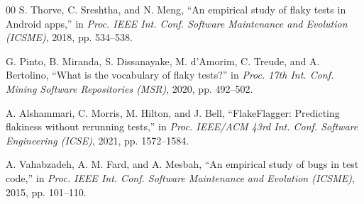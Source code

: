 \documentclass[conference]{IEEEtran}
\begin{document}
\begin{thebibliography}{00}
 S. Thorve, C. Sreshtha, and N. Meng, ``An empirical study of flaky tests in Android apps,'' in \textit{Proc. IEEE Int. Conf. Software Maintenance and Evolution (ICSME)}, 2018, pp. 534--538.

 G. Pinto, B. Miranda, S. Dissanayake, M. d'Amorim, C. Treude, and A. Bertolino, ``What is the vocabulary of flaky tests?'' in \textit{Proc. 17th Int. Conf. Mining Software Repositories (MSR)}, 2020, pp. 492--502.

 A. Alshammari, C. Morris, M. Hilton, and J. Bell, ``FlakeFlagger: Predicting flakiness without rerunning tests,'' in \textit{Proc. IEEE/ACM 43rd Int. Conf. Software Engineering (ICSE)}, 2021, pp. 1572--1584.

 A. Vahabzadeh, A. M. Fard, and A. Mesbah, ``An empirical study of bugs in test code,'' in \textit{Proc. IEEE Int. Conf. Software Maintenance and Evolution (ICSME)}, 2015, pp. 101--110.
\end{thebibliography}
\end{document}
